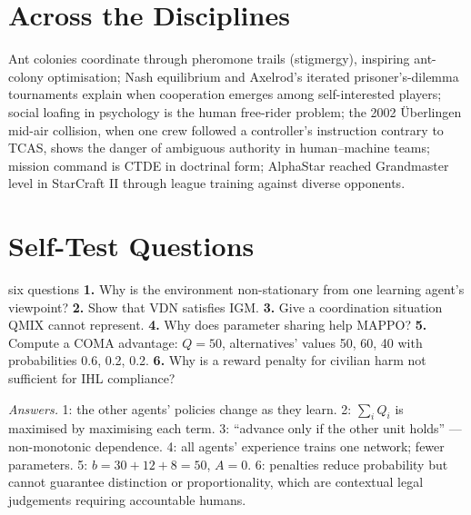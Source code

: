 \documentclass[11pt]{article}
\begin{document}
\section{Across the Disciplines}
Ant colonies coordinate through pheromone trails (stigmergy), inspiring ant-colony optimisation; Nash equilibrium and Axelrod's iterated prisoner's-dilemma tournaments explain when cooperation emerges among self-interested players; social loafing in psychology is the human free-rider problem; the 2002 \"Uberlingen mid-air collision, when one crew followed a controller's instruction contrary to TCAS, shows the danger of ambiguous authority in human--machine teams; mission command is CTDE in doctrinal form; AlphaStar reached Grandmaster level in StarCraft II through league training against diverse opponents.

\section{Self-Test Questions}
\begin{question}{six questions}
\textbf{1.} Why is the environment non-stationary from one learning agent's viewpoint? \textbf{2.} Show that VDN satisfies IGM. \textbf{3.} Give a coordination situation QMIX cannot represent. \textbf{4.} Why does parameter sharing help MAPPO? \textbf{5.} Compute a COMA advantage: $Q=50$, alternatives' values 50, 60, 40 with probabilities 0.6, 0.2, 0.2. \textbf{6.} Why is a reward penalty for civilian harm not sufficient for IHL compliance?

\textit{Answers.} 1: the other agents' policies change as they learn. 2: $\sum_iQ_i$ is maximised by maximising each term. 3: ``advance only if the other unit holds'' --- non-monotonic dependence. 4: all agents' experience trains one network; fewer parameters. 5: $b=30+12+8=50$, $A=0$. 6: penalties reduce probability but cannot guarantee distinction or proportionality, which are contextual legal judgements requiring accountable humans.
\end{question}
\end{document}
